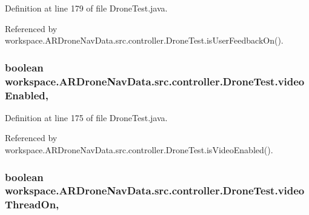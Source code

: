 Definition at line 179 of file Drone\+Test.\+java.



Referenced by workspace.\+A\+R\+Drone\+Nav\+Data.\+src.\+controller.\+Drone\+Test.\+is\+User\+Feedback\+On().

\hypertarget{classworkspace_1_1_a_r_drone_nav_data_1_1src_1_1controller_1_1_drone_test_ae3134418feba3bee7f2bdd2eaa6030e2}{}
\subsubsection[{video\+Enabled}]{\setlength{\rightskip}{0pt plus 5cm}boolean workspace.\+A\+R\+Drone\+Nav\+Data.\+src.\+controller.\+Drone\+Test.\+video\+Enabled\hspace{0.3cm}{\ttfamily [static]}, {\ttfamily [protected]}}\label{classworkspace_1_1_a_r_drone_nav_data_1_1src_1_1controller_1_1_drone_test_ae3134418feba3bee7f2bdd2eaa6030e2}


Definition at line 175 of file Drone\+Test.\+java.



Referenced by workspace.\+A\+R\+Drone\+Nav\+Data.\+src.\+controller.\+Drone\+Test.\+is\+Video\+Enabled().

\hypertarget{classworkspace_1_1_a_r_drone_nav_data_1_1src_1_1controller_1_1_drone_test_a576edd308264ecf530e1d800aa8cee1a}{}
\subsubsection[{video\+Thread\+On}]{\setlength{\rightskip}{0pt plus 5cm}boolean workspace.\+A\+R\+Drone\+Nav\+Data.\+src.\+controller.\+Drone\+Test.\+video\+Thread\+On\hspace{0.3cm}{\ttfamily [static]}, {\ttfamily [protected]}}\label{classworkspace_1_1_a_r_drone_nav_data_1_1src_1_1controller_1_1_drone_test_a576edd308264ecf530e1d800aa8cee1a}


